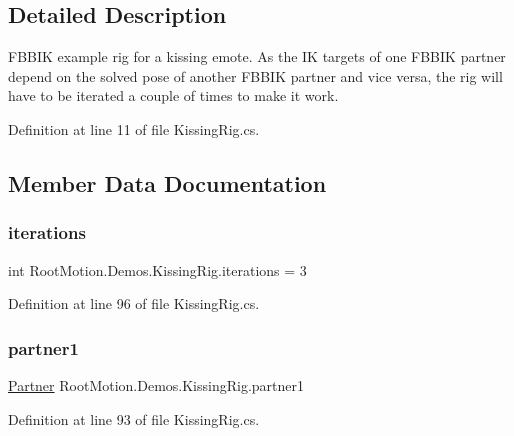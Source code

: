 \subsection{Detailed Description}
F\+B\+B\+IK example rig for a kissing emote. As the IK targets of one F\+B\+B\+IK partner depend on the solved pose of another F\+B\+B\+IK partner and vice versa, the rig will have to be iterated a couple of times to make it work. 



Definition at line 11 of file Kissing\+Rig.\+cs.



\subsection{Member Data Documentation}
\mbox{\label{class_root_motion_1_1_demos_1_1_kissing_rig_a53f93bef0ed545bc7ac7dcb3f37ae1d5}} 
\subsubsection{\texorpdfstring{iterations}{iterations}}
{\footnotesize\ttfamily int Root\+Motion.\+Demos.\+Kissing\+Rig.\+iterations = 3}



Definition at line 96 of file Kissing\+Rig.\+cs.

\mbox{\label{class_root_motion_1_1_demos_1_1_kissing_rig_ae772b8c98448bccb3433811138fe0d64}} 
\subsubsection{\texorpdfstring{partner1}{partner1}}
{\footnotesize\ttfamily \mbox{\hyperlink{class_root_motion_1_1_demos_1_1_kissing_rig_1_1_partner}{Partner}} Root\+Motion.\+Demos.\+Kissing\+Rig.\+partner1}



Definition at line 93 of file Kissing\+Rig.\+cs.

